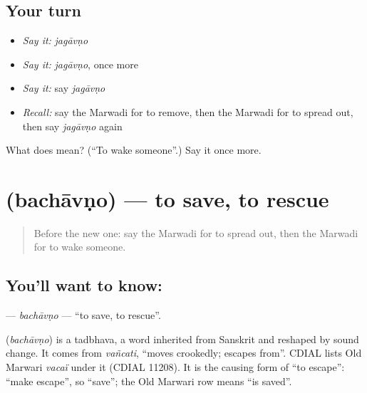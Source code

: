 \subsection*{Your turn}
\begin{itemize}
\raggedright
  \item \emph{Say it:} \emph{jagāvṇo}
  \item \emph{Say it:} \emph{jagāvṇo}, once more
  \item \emph{Say it:} say \emph{jagāvṇo}
  \item \emph{Recall:} say the Marwadi for to remove, then the Marwadi for to spread out, then say \emph{jagāvṇo} again
\end{itemize}

\begin{tcolorbox}[breakable,colback=teal!4,colframe=teal!35!black,title={Before you move on}]
What does  mean? (\textquotedblleft{}To wake someone\textquotedblright{}.) Say it once more.
\end{tcolorbox}
\section[\texorpdfstring{\mw{बचावणो} (bachāvṇo)}{बचावणो (bachāvṇo)}]{ (bachāvṇo) — to save, to rescue}

\label{lesson:MW-C108-bachavno}



\begin{quote}
Before the new one: say the Marwadi for to spread out, then the Marwadi for to wake someone.
\end{quote}

\subsection*{You'll want to know: }
\textbf{} — \emph{bachāvṇo} — \textquotedblleft{}to save, to rescue\textquotedblright{}.

\begin{cousinweb}
\textbf{} (\emph{bachāvṇo}) is a tadbhava, a word inherited from Sanskrit and reshaped by sound change. It comes from \emph{vañcati}, \textquotedblleft{}moves crookedly; escapes from\textquotedblright{}. CDIAL lists Old Marwari \emph{vacaï} under it (CDIAL 11208). It is the causing form of \textquotedblleft{}to escape\textquotedblright{}: \textquotedblleft{}make escape\textquotedblright{}, so \textquotedblleft{}save\textquotedblright{}; the Old Marwari row means \textquotedblleft{}is saved\textquotedblright{}.
\end{cousinweb}

